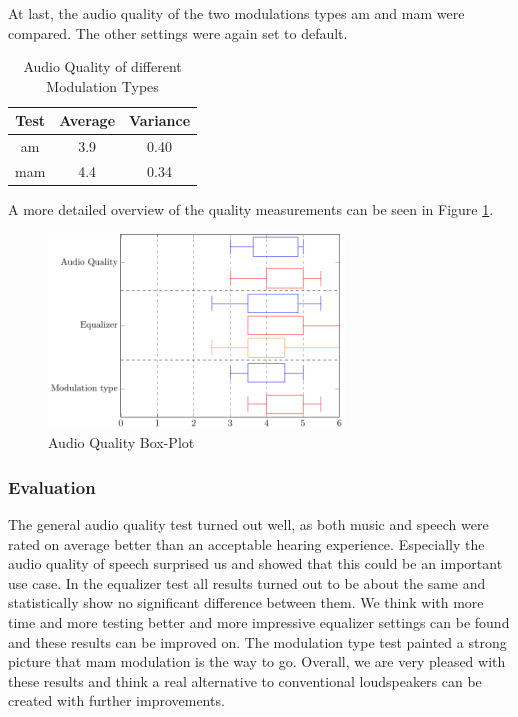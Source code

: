 \begin{enumerate}
    At last, the audio quality of the two modulations types \acrshort{am} and \acrshort{mam} were compared. The other settings were again set to default.
    \begin{center}
     \begin{table}[ht]
    \centering
    \begin{tabular}{ |c|c|c|}
      \hline 
      Test & Average & Variance \\ 
      \hline
     \acrshort{am} & 3.9 & 0.40 \\
     \hline
     \acrshort{mam} & 4.4 & 0.34 \\
     \hline
    \end{tabular}
    \caption{Audio Quality of different Modulation Types}
    \label{6.1.2_tab:music_audio_quality_mod}
    \end{table}   
    \end{center}
\end{enumerate}
A more detailed overview of the quality measurements can be seen in Figure \ref{6_fig:box_plot_quality}.
\begin{figure}[h!]
    \centering
    \includegraphics[width=0.7\textwidth]{images/6_Measurements/BoxPlotQuality.pdf}
    \caption{Audio Quality Box-Plot}
    \label{6_fig:box_plot_quality}
\end{figure}

\subsubsection{Evaluation}
The general audio quality test turned out well, as both music and speech were rated on average better than an acceptable hearing experience. Especially the audio quality of speech surprised us and showed that this could be an important use case. In the equalizer test all results turned out to be about the same and statistically show no significant difference between them. We think with more time and more testing better and more impressive equalizer settings can be found and these results can be improved on. 
The modulation type test painted a strong picture that \acrshort{mam} modulation is the way to go. 
Overall, we are very pleased with these results and think a real alternative to conventional loudspeakers can be created with further improvements. 
\newpage

